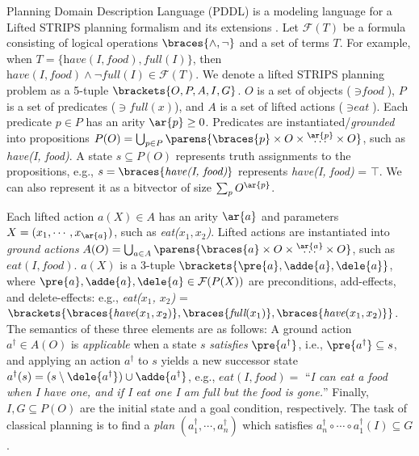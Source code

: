 Planning Domain Description Language (PDDL) is a modeling language for
a Lifted STRIPS planning formalism \citep{FikesHN72} and its extensions \citep{pddlbook}.
Let $\mathcal{F}(T)$ be a formula consisting of
 logical operations $\braces{\land,\lnot}$
and a set of terms $T$.
For example, when $T=\{\textit{have}(\textit{I}, \textit{food}), \textit{full}(\textit{I})\}$,
 then $\textit{have}(\textit{I}, \textit{food})\land\lnot\textit{full}(\textit{I})\in \mathcal{F}(T)$.
We denote a lifted STRIPS planning problem
as a 5-tuple $\brackets{O,P,A,I,G}$.
 $O$ is a set of objects ($\ni\textit{food}$),
 $P$ is a set of predicates ($\ni\textit{full}(x)$), and
 $A$ is a set of lifted actions ($\ni\textit{eat}$).
Each predicate $p\in P$ has an arity $\ar{p}\geq 0$.
Predicates are instantiated/\emph{grounded} into
propositions $P(O)=\bigcup_{p\in P} \parens{\braces{p}\times O\times\overset{\ar{p}}{\ldots}\times O}$,
such as \textit{have(I, food)}.
A state $s\subseteq P(O)$ represents truth assignments to the propositions,
e.g., $s=\braces{\textit{have(I, food)}}$ represents \textit{have(I, food)} = $\top$. %
We can also represent it as a bitvector of size $\sum_p O^{\ar{p}}$.

Each lifted action $a(X)\in A$ has an arity $\ar{a}$
and parameters $X=(x_1,\cdots,x_{\ar{a}})$, such as \textit{eat($x_1, x_2$)}.
Lifted actions are instantiated into 
\emph{ground actions} $A(O)=\bigcup_{a\in A} \parens{\braces{a}\times O\times\overset{\ar{a}}{\ldots}\times O}$,
such as $\textit{eat}(\textit{I},\textit{food})$.
$a(X)$ is a 3-tuple $\brackets{\pre{a},\adde{a},\dele{a}}$, where
 $\pre{a}, \adde{a}, \dele{a} \in \mathcal{F}(P(X))$ are
 preconditions, add-effects, and delete-effects:
e.g., \textit{eat($x_1$, $x_2$)} = $\brackets{\braces{\textit{have}(x_1, x_2)}, \braces{\textit{full}(x_1)}, \braces{\textit{have}(x_1,x_2)}}$.
The semantics of these three elements are as follows:
A ground action $a^{\dagger}\in A(O)$ is \emph{applicable} when a state $s$ \emph{satisfies} $\pre{a^{\dagger}}$, i.e., $\pre{a^{\dagger}}\subseteq s$,
and applying an action $a^{\dagger}$ to $s$ yields a new successor state
$a^{\dagger}(s) = (s \setminus \dele{a^{\dagger}}) \cup \adde{a^{\dagger}}$,
e.g., $\textit{eat}(\textit{I},\textit{food})=$ ``\emph{I can eat a food when I have one, and if I eat one I am full but the food is gone.}''
Finally,
$I,G\subseteq P(O)$ are the initial state and a goal condition, respectively.
The task of classical planning is to find a \emph{plan} $(a^{\dagger}_1,\cdots,a^{\dagger}_n)$
which satisfies $a^{\dagger}_n \circ \cdots \circ a^{\dagger}_1(I) \subseteq G$.
